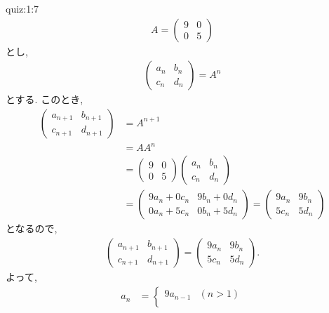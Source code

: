\begin{answerof}{quiz:1:7}
  \begin{align*}
    A=\begin{pmatrix}
      9&0\\0&5
    \end{pmatrix}
  \end{align*}
  とし,
  \begin{align*}
    \begin{pmatrix}
      a_n&b_n\\c_n&d_n
    \end{pmatrix}
    =A^n
  \end{align*}
  とする.
  このとき,
  \begin{align*}
    \begin{pmatrix}
      a_{n+1}&b_{n+1}\\c_{n+1}&d_{n+1}
    \end{pmatrix}
    &=A^{n+1}\\
    &=AA^{n}\\
    &=
    \begin{pmatrix}
      9&0\\0&5
    \end{pmatrix}
    \begin{pmatrix}
      a_n&b_n\\c_n&d_n
    \end{pmatrix}\\
    &=
    \begin{pmatrix}
      9a_n+0c_n&9b_n+0d_n\\0a_n+5c_n&0b_n+5d_n
    \end{pmatrix}
    =
    \begin{pmatrix}
      9a_n&9b_n\\5c_n&5d_n
    \end{pmatrix}
  \end{align*}
  となるので,
  \begin{align*}
    \begin{pmatrix}
      a_{n+1}&b_{n+1}\\c_{n+1}&d_{n+1}
    \end{pmatrix}
    =
    \begin{pmatrix}
      9a_n&9b_n\\5c_n&5d_n
    \end{pmatrix}.
  \end{align*}
  よって,
  \begin{align*}
    a_n&=
    \begin{cases}
      9a_{n-1} &(n>1)\\

\end{cases}
\end{align*}
\end{answerof}
